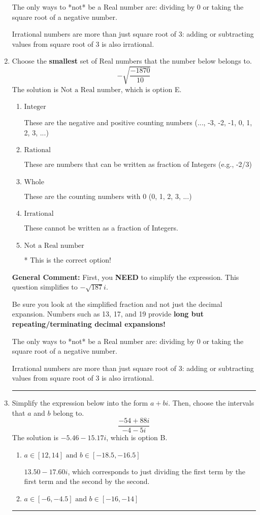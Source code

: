 \documentclass{extbook}[14pt]
\newcommand{\litem}[1]{\item #1

\rule{\textwidth}{0.4pt}}
\begin{document}
\begin{enumerate}
{ The only ways to *not* be a Real number are: dividing by 0 or taking the square root of a negative number. 
 
 Irrational numbers are more than just square root of 3: adding or subtracting values from square root of 3 is also irrational.
}
\litem{
Choose the \textbf{smallest} set of Real numbers that the number below belongs to.
\[ -\sqrt{\frac{-1870}{10}} \]The solution is \( \text{Not a Real number} \), which is option E.\begin{enumerate}[label=\Alph*.]
\item \( \text{Integer} \)

These are the negative and positive counting numbers (..., -3, -2, -1, 0, 1, 2, 3, ...)
\item \( \text{Rational} \)

These are numbers that can be written as fraction of Integers (e.g., -2/3)
\item \( \text{Whole} \)

These are the counting numbers with 0 (0, 1, 2, 3, ...)
\item \( \text{Irrational} \)

These cannot be written as a fraction of Integers.
\item \( \text{Not a Real number} \)

* This is the correct option!
\end{enumerate}

\textbf{General Comment:} First, you \textbf{NEED} to simplify the expression. This question simplifies to $-\sqrt{187} i$. 
 
 Be sure you look at the simplified fraction and not just the decimal expansion. Numbers such as 13, 17, and 19 provide \textbf{long but repeating/terminating decimal expansions!} 
 
 The only ways to *not* be a Real number are: dividing by 0 or taking the square root of a negative number. 
 
 Irrational numbers are more than just square root of 3: adding or subtracting values from square root of 3 is also irrational.
}
\litem{
Simplify the expression below into the form $a+bi$. Then, choose the intervals that $a$ and $b$ belong to.
\[ \frac{-54 + 88 i}{-4 - 5 i} \]The solution is \( -5.46  - 15.17 i \), which is option B.\begin{enumerate}[label=\Alph*.]
\item \( a \in [12, 14] \text{ and } b \in [-18.5, -16.5] \)

 $13.50  - 17.60 i$, which corresponds to just dividing the first term by the first term and the second by the second.
\item \( a \in [-6, -4.5] \text{ and } b \in [-16, -14] \)


\end{enumerate}}
\end{enumerate}
\end{document}
